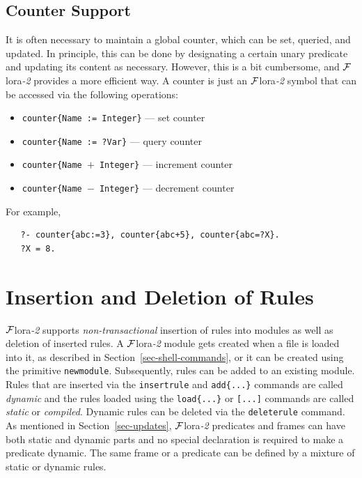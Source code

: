 \documentclass[11pt]{article}
\newcommand{\FLORA}{{\mbox{\sc ${\cal F}${lora}\rm\emph{-2}}}\xspace}
\newcommand{\FLSYSTEM}{\FLORA}
\begin{document}
\ifdef{\isfloraman}{}
{
    
}


\subsection{Counter Support}

It is often necessary to maintain a global counter, which can be set,
queried, and updated. In principle, this can be done
by designating a certain unary predicate and updating its content as necessary.
However, this is a bit cumbersome, and \FLSYSTEM provides a more efficient
way. A counter is just an \FLSYSTEM symbol that can be accessed via the
following operations:

\begin{itemize}
\item \texttt{counter\{Name := Integer\}} --- set counter
\item \texttt{counter\{Name := ?Var\}} --- query counter
\item \texttt{counter\{Name $+$ Integer\}} --- increment counter
\item \texttt{counter\{Name $-$ Integer\}} --- decrement counter
\end{itemize}
For example,
\begin{verbatim}
   ?- counter{abc:=3}, counter{abc+5}, counter{abc=?X}.
   ?X = 8.
\end{verbatim}



\section{Insertion and Deletion of Rules}
\label{sec-rule-update}

\FLSYSTEM supports \emph{non-transactional} insertion of rules into modules as
well as deletion of inserted rules.  A \FLSYSTEM module gets created when a
file is loaded into it, as described in
Section~\ref{sec-shell-commands}, or it can be created using the primitive
{\tt newmodule}. Subsequently, rules can be added to an existing module.
Rules that are inserted via the {\tt insertrule} and {\tt add\{...\}} commands
are called \emph{dynamic} and the rules loaded using the {\tt load\{...\}} or
{\tt [...]} commands are called \emph{static} or \emph{compiled}.  Dynamic
rules can be deleted via the {\tt deleterule} command. As mentioned in
Section~\ref{sec-updates}, \FLSYSTEM predicates and frames can have both
static and dynamic parts and no special declaration is required to make a
predicate dynamic. The same frame or a predicate can be defined by a
mixture of static or dynamic rules.
\end{document}
